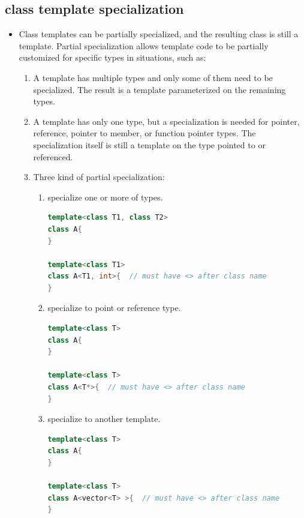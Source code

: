 \documentclass[a4paper,11pt,twoside]{book}
\begin{document}
\subsection{class template specialization}
\begin{itemize}
	\item Class templates can be partially specialized, and the resulting class is still a template. Partial specialization allows template code to be partially customized for specific types in situations, such as:

	\begin{enumerate}
		\item A template has multiple types and only some of them need to be specialized. The result is a template parameterized on the remaining types.

		\item A template has only one type, but a specialization is needed for pointer, reference, pointer to member, or function pointer types. The specialization itself is still a template on the type pointed to or referenced.
		
		\item Three kind of partial specialization:
		\begin{enumerate}
			\item specialize one or more of types.
\begin{lstlisting}[frame=single, language=c++]
template<class T1, class T2>
class A{
}

template<class T1>
class A<T1, int>{  // must have <> after class name
}		
\end{lstlisting}				
			
			\item specialize to point or reference type.
\begin{lstlisting}[frame=single, language=c++]
template<class T>
class A{
}

template<class T>
class A<T*>{  // must have <> after class name
}		
\end{lstlisting}	
			\item specialize to another template.
\begin{lstlisting}[frame=single, language=c++]
template<class T>
class A{
}

template<class T>
class A<vector<T> >{  // must have <> after class name
}			
\end{lstlisting}	

		\end{enumerate}
	

\end{enumerate}
\end{itemize}
\end{document}
